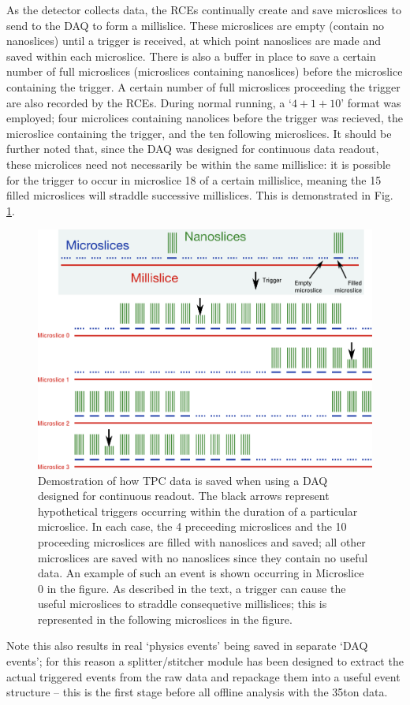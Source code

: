 As the detector collects data, the RCEs continually create and save microslices to send to the DAQ to form a millislice.  These microslices are empty (contain no nanoslices) until a trigger is received, at which point nanoslices are made and saved within each microslice.  There is also a buffer in place to save a certain number of full microslices (microslices containing nanoslices) before the microslice containing the trigger.  A certain number of full microslices proceeding the trigger are also recorded by the RCEs.  During normal running, a `$4+1+10$' format was employed; four microlices containing nanolices before the trigger was recieved, the microslice containing the trigger, and the ten following microslices.  It should be further noted that, since the DAQ was designed for continuous data readout, these microlices need not necessarily be within the same millislice: it is possible for the trigger to occur in microslice 18 of a certain millislice, meaning the 15 filled microslices will straddle successive millislices.  This is demonstrated in Fig. \ref{fig:MicrosliceTrigger}.

\begin{figure}[ht]
  \centering
  \includegraphics[width=16cm]{microsliceTrigger.png}
  \caption{Demostration of how TPC data is saved when using a DAQ designed for continuous readout.  The black arrows represent hypothetical triggers occurring within the duration of a particular microslice.  In each case, the 4 preceeding microslices and the 10 proceeding microslices are filled with nanoslices and saved; all other microslices are saved with no nanoslices since they contain no useful data.  An example of such an event is shown occurring in Microslice 0 in the figure.  As described in the text, a trigger can cause the useful microslices to straddle consequetive millislices; this is represented in the following microslices in the figure.}
  \label{fig:MicrosliceTrigger}
\end{figure}
Note this also results in real `physics events' being saved in separate `DAQ events'; for this reason a splitter/stitcher module has been designed to extract the actual triggered events from the raw data and repackage them into a useful event structure -- this is the first stage before all offline analysis with the 35ton data.

